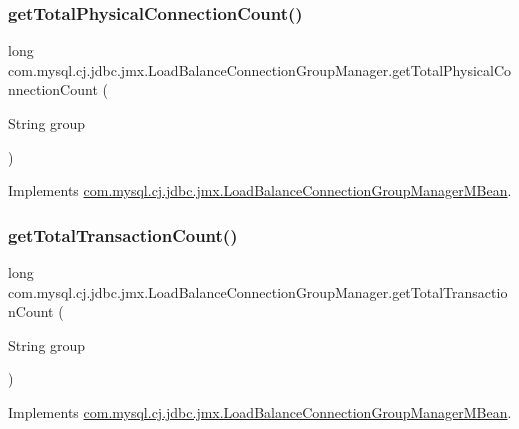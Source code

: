 \subsubsection{\texorpdfstring{get\+Total\+Physical\+Connection\+Count()}{getTotalPhysicalConnectionCount()}}
{\footnotesize\ttfamily long com.\+mysql.\+cj.\+jdbc.\+jmx.\+Load\+Balance\+Connection\+Group\+Manager.\+get\+Total\+Physical\+Connection\+Count (\begin{DoxyParamCaption}\item[{String}]{group }\end{DoxyParamCaption})}



Implements \mbox{\hyperlink{interfacecom_1_1mysql_1_1cj_1_1jdbc_1_1jmx_1_1_load_balance_connection_group_manager_m_bean_a12f21183a708bf2ef19b0272df94836b}{com.\+mysql.\+cj.\+jdbc.\+jmx.\+Load\+Balance\+Connection\+Group\+Manager\+M\+Bean}}.

\mbox{\label{classcom_1_1mysql_1_1cj_1_1jdbc_1_1jmx_1_1_load_balance_connection_group_manager_a326883b94b5b7d63d55dbfd1db697d6d}} 
\subsubsection{\texorpdfstring{get\+Total\+Transaction\+Count()}{getTotalTransactionCount()}}
{\footnotesize\ttfamily long com.\+mysql.\+cj.\+jdbc.\+jmx.\+Load\+Balance\+Connection\+Group\+Manager.\+get\+Total\+Transaction\+Count (\begin{DoxyParamCaption}\item[{String}]{group }\end{DoxyParamCaption})}



Implements \mbox{\hyperlink{interfacecom_1_1mysql_1_1cj_1_1jdbc_1_1jmx_1_1_load_balance_connection_group_manager_m_bean_a568d8a28564e0e4f6ddc61e598ec757e}{com.\+mysql.\+cj.\+jdbc.\+jmx.\+Load\+Balance\+Connection\+Group\+Manager\+M\+Bean}}.

